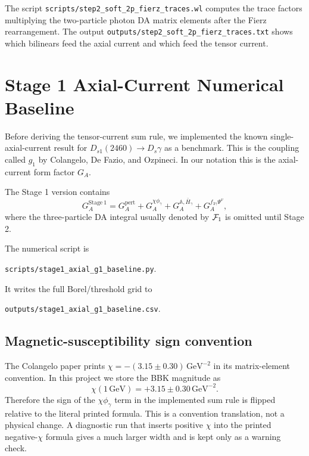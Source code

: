 \documentclass[11pt]{article}
\begin{document}
The script \texttt{scripts/step2\_soft\_2p\_fierz\_traces.wl} computes the
trace factors multiplying the two-particle photon DA matrix elements after the
Fierz rearrangement.  The output
\texttt{outputs/step2\_soft\_2p\_fierz\_traces.txt} shows which bilinears feed
the axial current and which feed the tensor current.

\section{Stage 1 Axial-Current Numerical Baseline}

Before deriving the tensor-current sum rule, we implemented the known
single-axial-current result for
$D_{s1}(2460)\to D_s\gamma$ as a benchmark.  This is the coupling called
$g_1$ by Colangelo, De Fazio, and Ozpineci.  In our notation this is the
axial-current form factor $G_A$.

The Stage 1 version contains
\begin{equation}
  G_A^{\mathrm{Stage\ 1}}
  =
  G_A^{\mathrm{pert}}
  +
  G_A^{\chi\phi_\gamma}
  +
  G_A^{\mathbb A,\bar H_\gamma}
  +
  G_A^{f_{3\gamma}\Psi^v},
\end{equation}
where the three-particle DA integral usually denoted by ${\cal F}_1$ is omitted
until Stage 2.

The numerical script is
\begin{center}
  \texttt{scripts/stage1\_axial\_g1\_baseline.py}.
\end{center}
It writes the full Borel/threshold grid to
\begin{center}
  \texttt{outputs/stage1\_axial\_g1\_baseline.csv}.
\end{center}

\subsection{Magnetic-susceptibility sign convention}

The Colangelo paper prints $\chi=-(3.15\pm0.30)\,\mathrm{GeV}^{-2}$ in its
matrix-element convention.  In this project we store the BBK magnitude as
\begin{equation}
  \chi(1\,\mathrm{GeV})=+3.15\pm0.30\,\mathrm{GeV}^{-2}.
\end{equation}
Therefore the sign of the $\chi\phi_\gamma$ term in the implemented sum rule is
flipped relative to the literal printed formula.  This is a convention
translation, not a physical change.  A diagnostic run that inserts positive
$\chi$ into the printed negative-$\chi$ formula gives a much larger width and is
kept only as a warning check.
\end{document}
